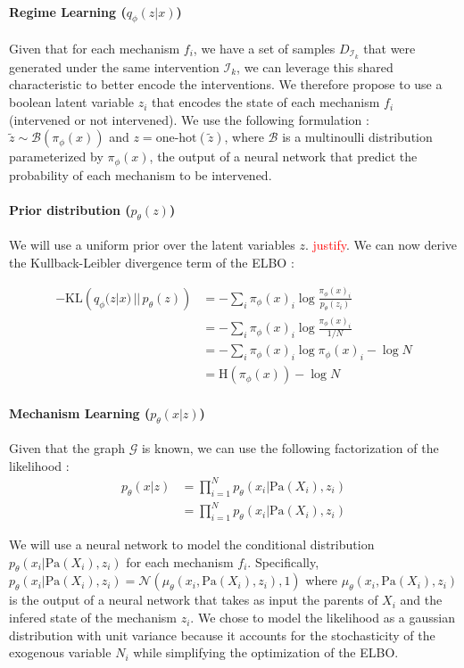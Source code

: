 \documentclass{article}
\newcommand\todo[1]{\textcolor{red}{#1}}
\begin{document}
\paragraph{Regime Learning ($q_\phi(z | x)$)}Given that for each mechanism $f_i$, we have a set of samples $D_{\mathcal{I}_k}$ that were generated under the same intervention $\mathcal{I}_k$, we can leverage this shared characteristic to better encode the interventions. We therefore propose to use a boolean latent variable $z_i$ that encodes the state of each mechanism $f_i$ (intervened or not intervened). We use the following formulation : $\tilde{z} \sim \mathcal{B}(\pi_\phi(x))$ and $z = \text{one-hot}(\tilde{z})$, where $\mathcal{B}$ is a multinoulli distribution parameterized by $\pi_\phi(x)$, the output of a neural network that predict the probability of each mechanism to be intervened.



\paragraph{Prior distribution ($p_\theta(z)$)} We will use a uniform prior over the latent variables $z$. \todo{justify}. We can now derive the Kullback-Leibler divergence term of the ELBO :

\begin{align*}
    -\text{KL}\left(q_\phi(z | x) \,||\, p_\theta(z)\right)
    &= - \sum_{i} \pi_\phi(x)_i \log \frac{\pi_\phi(x)_i}{p_\theta(z_i)} \\
    &= - \sum_{i} \pi_\phi(x)_i \log \frac{\pi_\phi(x)_i}{1/N} \\
    &= - \sum_{i} \pi_\phi(x)_i \log \pi_\phi(x)_i - \log N \\
    &= \text{H}(\pi_\phi(x)) - \log N
\end{align*}

\paragraph{Mechanism Learning ($p_\theta(x | z)$)}

Given that the graph $\mathcal{G}$ is known, we can use the following factorization of the likelihood :
\begin{align*}
    p_\theta(x | z) &= \prod_{i = 1}^N p_\theta(x_i | \text{Pa}(X_i), z_i) \\
    &= \prod_{i = 1}^N p_\theta(x_i | \text{Pa}(X_i), z_i)
\end{align*}

We will use a neural network to model the conditional distribution $p_\theta(x_i | \text{Pa}(X_i), z_i)$ for each mechanism $f_i$. Specifically, $p_\theta(x_i | \text{Pa}(X_i), z_i) = \mathcal{N}(\mu_\theta(x_i, \text{Pa}(X_i), z_i), 1)$ where $\mu_\theta(x_i, \text{Pa}(X_i), z_i)$ is the output of a neural network that takes as input the parents of $X_i$ and the infered state of the mechanism $z_i$. We chose to model the likelihood as a gaussian distribution with unit variance because it accounts for the stochasticity of the exogenous variable $N_i$ while simplifying the optimization of the ELBO.
\end{document}

